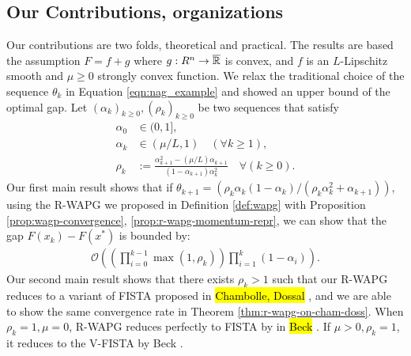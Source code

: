 \documentclass[12pt]{article}
\begin{document}
    \subsection{Our Contributions, organizations}
        Our contributions are two folds, theoretical and practical. 
        The results are based the assumption $F = f + g$ where $g:R^n \rightarrow \overline{\mathbb R}$ is convex, and $f$ is an $L$-Lipschitz smooth and $\mu \ge 0$ strongly convex function. 
        We relax the traditional choice of the sequence $\theta_k$ in Equation \ref{eqn:nag_example} and showed an upper bound of the optimal gap. 
        Let $(\alpha_k)_{k \ge0}, (\rho_k)_{k \ge 0}$ be two sequences that satisfy
        \begin{align*}
            \alpha_0 &\in (0, 1], 
            \\
            \alpha_k &\in (\mu/L, 1) \quad (\forall k \ge 1), 
            \\
            \rho_k &:= \frac{\alpha_{k + 1}^2 - (\mu/L)\alpha_{k + 1}}{(1 - \alpha_{k + 1})\alpha_k^2} \quad \forall (k \ge 0). 
        \end{align*}
        Our first main result shows that if $\theta_{k + 1} = (\rho_k\alpha_k(1 - \alpha_k)/(\rho_k\alpha_k^2 + \alpha_{k + 1}))$, using the R-WAPG we proposed in Definition \ref{def:wapg} with Proposition \ref{prop:wagp-convergence}, \ref{prop:r-wapg-momentum-repr}, we can show that the gap $F(x_k) - F(x^*)$ is bounded by:
        \begin{align*}
            \mathcal O\left(
                \left(
                    \prod_{i = 0}^{k - 1} \max(1, \rho_{k})
                \right)
                \prod_{i = 1}^{k} \left(1  - \alpha_i\right)
            \right). 
        \end{align*}
        Our second main result shows that there exists $\rho_k > 1$ such that our R-WAPG reduces to a variant of FISTA proposed in 
        {\hl{Chambolle, Dossal}} \cite{chambolle_convergence_2015},
        and we are able to show the same convergence rate in Theorem \ref{thm:r-wapg-on-cham-doss}. 
        When $\rho_k = 1, \mu = 0$, R-WAPG reduces perfectly to FISTA by in 
        {\hl{Beck}} \cite{beck_fast_2009}.
        If $\mu > 0, \rho_k = 1$, it reduces to the V-FISTA by Beck \cite{beck_first-order_2017}. 
\end{document}
